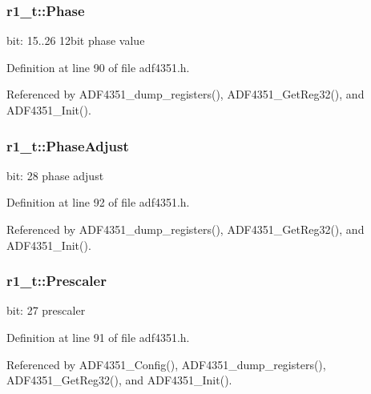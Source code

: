 \subsubsection[{\texorpdfstring{Phase}{Phase}}]{ r1\+\_\+t\+::\+Phase}\hypertarget{structr1__t_a08f87626a225a1256a9c45bb0d42af8a}{}\label{structr1__t_a08f87626a225a1256a9c45bb0d42af8a}
bit\+: 15..26 12bit phase value 

Definition at line 90 of file adf4351.\+h.



Referenced by A\+D\+F4351\+\_\+dump\+\_\+registers(), A\+D\+F4351\+\_\+\+Get\+Reg32(), and A\+D\+F4351\+\_\+\+Init().

\subsubsection[{\texorpdfstring{Phase\+Adjust}{PhaseAdjust}}]{ r1\+\_\+t\+::\+Phase\+Adjust}\hypertarget{structr1__t_a339b676bde09218794b49904eb456a38}{}\label{structr1__t_a339b676bde09218794b49904eb456a38}
bit\+: 28 phase adjust 

Definition at line 92 of file adf4351.\+h.



Referenced by A\+D\+F4351\+\_\+dump\+\_\+registers(), A\+D\+F4351\+\_\+\+Get\+Reg32(), and A\+D\+F4351\+\_\+\+Init().

\subsubsection[{\texorpdfstring{Prescaler}{Prescaler}}]{ r1\+\_\+t\+::\+Prescaler}\hypertarget{structr1__t_a9ee672a7fdd3a2d60591d43557feb390}{}\label{structr1__t_a9ee672a7fdd3a2d60591d43557feb390}
bit\+: 27 prescaler 

Definition at line 91 of file adf4351.\+h.



Referenced by A\+D\+F4351\+\_\+\+Config(), A\+D\+F4351\+\_\+dump\+\_\+registers(), A\+D\+F4351\+\_\+\+Get\+Reg32(), and A\+D\+F4351\+\_\+\+Init().

